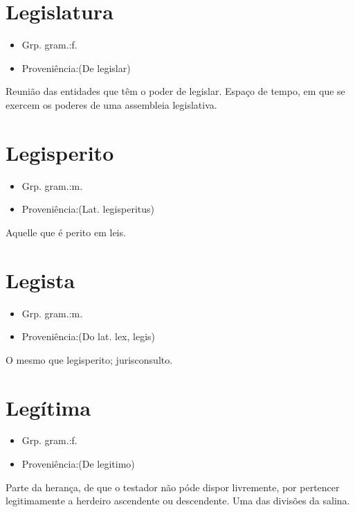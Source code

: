 \section{Legislatura}
\begin{itemize}
\item {Grp. gram.:f.}
\end{itemize}
\begin{itemize}
\item {Proveniência:(De \textunderscore legislar\textunderscore )}
\end{itemize}
Reunião das entidades que têm o poder de legislar.
Espaço de tempo, em que se exercem os poderes de uma assembleia legislativa.
\section{Legisperito}
\begin{itemize}
\item {Grp. gram.:m.}
\end{itemize}
\begin{itemize}
\item {Proveniência:(Lat. \textunderscore legisperitus\textunderscore )}
\end{itemize}
Aquelle que é perito em leis.
\section{Legista}
\begin{itemize}
\item {Grp. gram.:m.}
\end{itemize}
\begin{itemize}
\item {Proveniência:(Do lat. \textunderscore lex\textunderscore , \textunderscore legis\textunderscore )}
\end{itemize}
O mesmo que \textunderscore legisperito\textunderscore ; jurisconsulto.
\section{Legítima}
\begin{itemize}
\item {Grp. gram.:f.}
\end{itemize}
\begin{itemize}
\item {Proveniência:(De \textunderscore legitimo\textunderscore )}
\end{itemize}
Parte da herança, de que o testador não póde dispor livremente, por pertencer legitimamente a herdeiro ascendente ou descendente.
Uma das divisões da salina.
